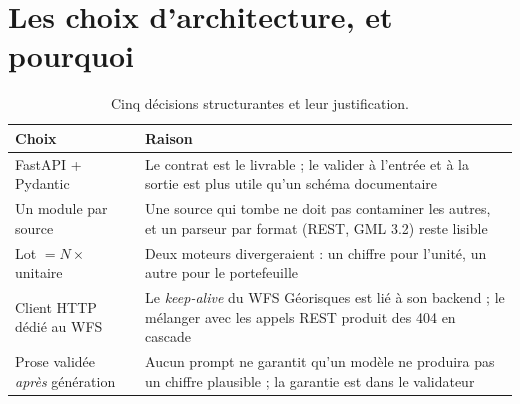 \section{Les choix d'architecture, et pourquoi}

\begin{table}[h]
\centering
\small
\begin{tabularx}{\textwidth}{@{}p{4.6cm}X@{}}
\toprule
\textbf{Choix} & \textbf{Raison} \\
\midrule
FastAPI + Pydantic & Le contrat est le livrable ; le valider à l'entrée et à la
  sortie est plus utile qu'un schéma documentaire \\
Un module par source & Une source qui tombe ne doit pas contaminer les autres, et
  un parseur par format (REST, GML 3.2) reste lisible \\
Lot \(= N \times\) unitaire & Deux moteurs divergeraient : un chiffre pour
  l'unité, un autre pour le portefeuille \\
Client HTTP dédié au WFS & Le \emph{keep-alive} du WFS Géorisques est lié à son
  backend ; le mélanger avec les appels REST produit des 404 en cascade \\
Prose validée \emph{après} génération & Aucun prompt ne garantit qu'un modèle ne
  produira pas un chiffre plausible ; la garantie est dans le validateur \\
\bottomrule
\end{tabularx}
\caption{Cinq décisions structurantes et leur justification.}
\end{table}
